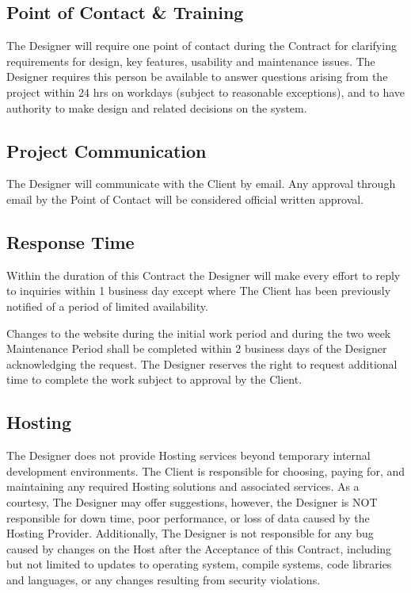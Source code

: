 \documentclass[usletter,12pt]{article} %
\begin{document}

\subsection{Point of Contact \& Training}

The Designer will require one point of contact during the Contract for clarifying requirements for design, key features, usability and maintenance issues. The Designer requires this person be available to answer questions arising from the project within 24 hrs on workdays (subject to reasonable exceptions), and to have authority to make design and related decisions on the system.


\subsection{Project Communication}

The Designer will communicate with the Client by email. Any approval through email by the Point of Contact will be considered official written approval.


\subsection{Response Time}

Within the duration of this Contract the Designer will make every effort to reply to inquiries within 1 business day except where The Client has been previously notified of a period of limited availability.

Changes to the website during the initial work period and during the two week Maintenance Period shall be completed within 2 business days of the Designer acknowledging the request. The Designer reserves the right to request additional time to complete the work subject to approval by the Client.


\subsection{Hosting}

The Designer does not provide Hosting services beyond temporary internal development environments. The Client is responsible for choosing, paying for, and maintaining any required Hosting solutions and associated services. As a courtesy, The Designer may offer suggestions, however, the Designer is NOT responsible for down time, poor performance, or loss of data caused by the Hosting Provider. Additionally, The Designer is not responsible for any bug caused by changes on the Host after the Acceptance of this Contract, including but not limited to updates to operating system, compile systems, code libraries and languages, or any changes resulting from security violations.
\end{document}
